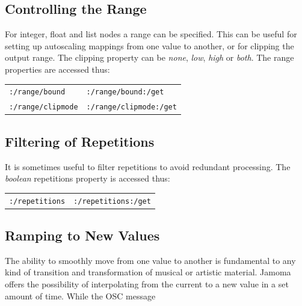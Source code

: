 \documentclass{NIME-alternate}
\begin{document}




\subsection{Controlling the Range} %
\label{sub:range}

For integer, float and list nodes a range can be specified. This can be useful for setting up autoscaling mappings from one value to another, or for clipping the output range. The clipping property can be \emph{none}, \emph{low}, \emph{high} or \emph{both}. The range properties are accessed thus:

\begin{tabular}{ll}
	\texttt{:/range/bound} & \texttt{:/range/bound:/get} \\
	\texttt{:/range/clipmode}  & \texttt{:/range/clipmode:/get} \\
\end{tabular}





\subsection{Filtering of Repetitions} %
\label{sub:filtering_of_repetitions}

It is sometimes useful to filter repetitions to avoid redundant processing. The \emph{boolean} repetitions property is accessed thus:

\begin{tabular}{ll}
	\texttt{:/repetitions} & \texttt{:/repetitions:/get} \\
\end{tabular}





\subsection{Ramping to New Values} %
\label{sub:ramping_to_new_values}

The ability to smoothly move from one value to another is fundamental to any kind of transition and transformation of musical or artistic material. Jamoma offers the possibility of interpolating from the current to a new value in a set amount of time. While the OSC message
\end{document}
